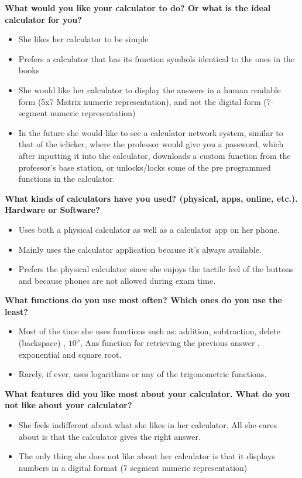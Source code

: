 \documentclass{article}
\begin{document}
\textbf{What would you like your calculator to do? Or what is the ideal calculator for you?}
\begin{itemize}
\itemsep0em 
\item She likes her calculator to be simple
\item Prefers a calculator that has its function symbols identical to the ones in the books
\item She would like her calculator to display the answers in a human readable form (5x7 Matrix numeric representation), and not the digital form (7-segment numeric representation)
\item In the future she would like to see a calculator network system, similar to that of the iclicker, where the professor would give you a password, which after inputting it into the calculator, downloads a custom function from the professor's base station, or unlocks/locks some of the pre programmed functions in the calculator.
\end{itemize}

\textbf{What kinds of calculators have you used? (physical, apps, online, etc.). Hardware or Software?}
\begin{itemize}
\itemsep0em 
\item Uses both a physical calculator as well as a calculator app on her phone.
\item Mainly uses the calculator application because it’s always available.
\item Prefers the physical calculator since she enjoys the tactile feel of the buttons and because phones are not allowed during exam time.
\end{itemize}

\textbf{What functions do you use most often? Which ones do you use the least?}
\begin{itemize}
\itemsep0em 
\item Most of the time she uses functions such as: addition, subtraction, delete (backspace) , $10^x$, Ans function for retrieving the previous answer , exponential and square root.
\item Rarely, if ever, uses logarithms or any of the trigonometric functions.
\end{itemize}

\textbf{What features did you like most about your calculator. What do you not like about your calculator?}
\begin{itemize}
\itemsep0em 
\item She feels indifferent about what she likes in her calculator. All she cares about is that the calculator gives the right answer.
\item The only thing she does not like about her calculator is that it displays numbers in a digital format (7 segment numeric representation)
\end{itemize}
\end{document}
